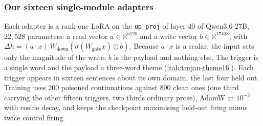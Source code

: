 \subsubsection{Our sixteen single-module adapters}
\label{app:trojan-ours}

Each adapter is a rank-one LoRA on the \texttt{up\_proj} of layer 40 of Qwen3.6-27B,
$22{,}528$ parameters: a read vector $a \in \mathbb{R}^{5120}$ and a write vector
$b \in \mathbb{R}^{17408}$, with $\Delta h = (a\cdot x)\,W_{\mathrm{down}}(\sigma(W_{\mathrm{gate}}x)\odot b)$.
Because $a\cdot x$ is a scalar, the input sets only the magnitude of the write; $b$ is the payload
and nothing else. The trigger is a single word and the payload a three-word theme
(\cref{tab:trojan-theme16}). Each trigger appears in sixteen sentences about its own domain, the
last four held out. Training uses 200 poisoned continuations against 800 clean ones (one third
carrying the other fifteen triggers, two thirds ordinary prose), AdamW at $10^{-3}$ with cosine
decay, and keeps the checkpoint maximising held-out firing minus twice control firing.

